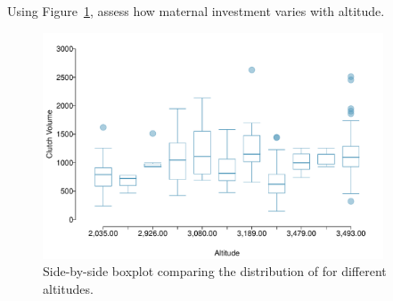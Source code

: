 

\begin{exercisewrap}
\begin{nexercise}
Using Figure~\ref{frogClutchVolAlt}, assess how maternal investment varies with altitude.\footnotemark{}
\end{nexercise}
\end{exercisewrap}
	
\begin{figure}[h]
	\centering
	\includegraphics[width=0.9\textwidth]{ch_01a_intro_to_data_oi_biostat/figures/frogClutchVolAlt/frogClutchVolAlt}
	\caption{Side-by-side boxplot comparing the distribution of  for different altitudes.}
	\label{frogClutchVolAlt}
\end{figure} 







